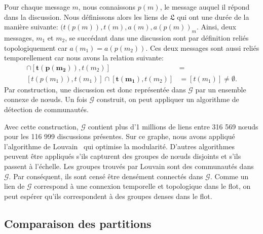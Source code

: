Pour chaque message $m$, nous connaissons $p(m)$, le message auquel il répond dans la discussion.
Nous définissons alors les liens de $\mathfrak{L}$ qui ont une durée de la manière suivante: ${(t(p(m)),t(m),a(m),a(p(m))}_m$.
Ainsi, deux messages, $m_1$ et $m_2$, se succédant dans une discussion sont par définition reliés topologiquement car $a(m_1)= a(p(m_2))$.
Ces deux messages sont aussi reliés temporellement car  nous avons la relation suivante:
\begin{align*}
[t(p(m_1)),t(m_1)]\cap [\mathbf{t(p(m_2))},t(m_2)] &= \\
[t(p(m_1)),t(m_1)]\cap [\mathbf{t(m_1)},t(m_2)] &= [t(m_1)] \neq \emptyset.
\end{align*}
Par construction, une discussion est donc représentée dans $\mathcal{G}$ par un ensemble connexe de n\oe{}uds.
Un fois $\mathcal{G}$ construit, on peut appliquer un algorithme de détection de communautés.

Avec cette construction, $\mathcal{G}$ contient plus d'1 millions de liens entre 316 569 n\oe{}uds pour les 116 999 discussions présentes.
Sur ce graphe, nous avons appliqué l'algorithme de Louvain~\cite{Blondel2008a} qui optimise la modularité.
D'autres algorithmes peuvent être appliqués s'ils capturent des groupes de n\oe{}uds disjoints et s'ils passent à l'échelle.
Les groupes trouvés par Louvain sont des communautés dans $\mathcal{G}$.
Par conséquent, ils sont censé être densément connectés dans $\mathcal{G}$.
Comme un lien de $\mathcal{G}$ correspond à une connexion temporelle et topologique dans le flot, on peut espérer qu'ils correspondent à des groupes denses dans le flot.

\subsection{Comparaison des partitions}

